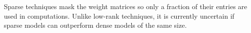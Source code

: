 Sparse techniques mask the weight matrices so only a fraction of their entries are used in computations. Unlike low-rank techniques, it is currently uncertain if sparse models can outperform dense models of the same size.





